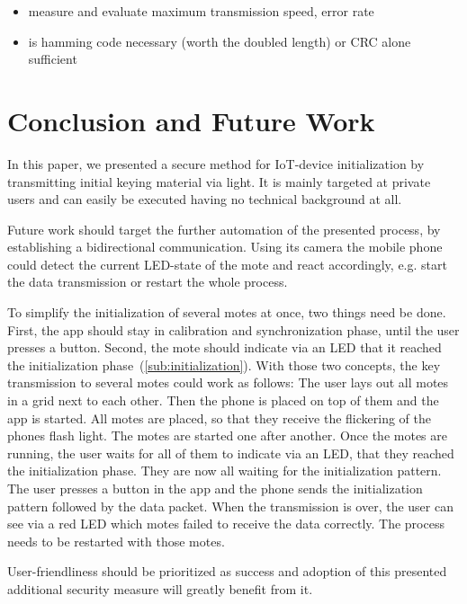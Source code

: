 \documentclass{sig-alternate} %
\begin{document}
\begin{itemize}
	\item measure and evaluate maximum transmission speed, error rate
	\item is hamming code necessary (worth the doubled length) or CRC alone sufficient
\end{itemize}



\section{Conclusion and Future Work}
\label{sec:future_work}

In this paper, we presented a secure method for IoT-device initialization by transmitting initial keying material via light.
It is mainly targeted at private users and can easily be executed having no technical background at all.

Future work should target the further automation of the presented process, by establishing a bidirectional communication.
Using its camera the mobile phone could detect the current LED-state of the mote and react accordingly, e.g. start the data transmission or restart the whole process.

To simplify the initialization of several motes at once, two things need be done.
First, the app should stay in calibration and synchronization phase, until the user presses a button.
Second, the mote should indicate via an LED that it reached the initialization phase~(\ref{sub:initialization}).
With those two concepts, the key transmission to several motes could work as follows: 
The user lays out all motes in a grid next to each other.
Then the phone is placed on top of them and the app is started.
All motes are placed, so that they receive the flickering of the phones flash light.
The motes are started one after another.
Once the motes are running, the user waits for all of them to indicate via an LED, that they reached the initialization phase.
They are now all waiting for the initialization pattern.
The user presses a button in the app and the phone sends the initialization pattern followed by the data packet.
When the transmission is over, the user can see via a red LED which motes failed to receive the data correctly.
The process needs to be restarted with those motes.


User-friendliness should be prioritized as success and adoption of this presented additional security measure will greatly benefit from it.




\end{document}
